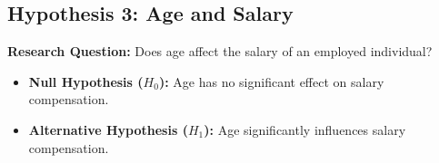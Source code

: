 \subsection{Hypothesis 3: Age and Salary}
\textbf{Research Question:} Does age affect the salary of an employed individual?

\begin{itemize}
    \item \textbf{Null Hypothesis ($H_0$):} Age has no significant effect on salary compensation.
    \item \textbf{Alternative Hypothesis ($H_1$):} Age significantly influences salary compensation.
\end{itemize}